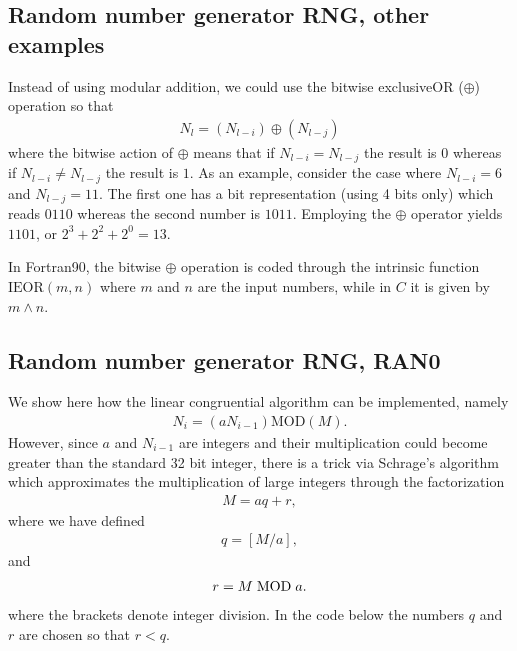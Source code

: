 \documentclass[letterpaper,10pt,english]{sphinxmanual}
\begin{document}
\subsection{Random number generator RNG, other examples}
\label{\detokenize{chapter2:id9}}
Instead of  using modular addition, we could use the bitwise
exclusive\sphinxhyphen{}OR (\(\oplus\)) operation so that
\begin{equation*}
\begin{split}
N_l=(N_{l-i})\oplus (N_{l-j})
\end{split}
\end{equation*}
where the bitwise action of \(\oplus\) means that if \(N_{l-i}=N_{l-j}\) the result is
\(0\) whereas if \(N_{l-i}\ne N_{l-j}\) the result is
\(1\). As an example, consider the case where  \(N_{l-i}=6\) and \(N_{l-j}=11\). The first
one has a bit representation (using 4 bits only) which reads \(0110\) whereas the
second number is \(1011\). Employing the \(\oplus\) operator yields
\(1101\), or \(2^3+2^2+2^0=13\).

In Fortran90, the bitwise \(\oplus\) operation is coded through the intrinsic
function \(\mathrm{IEOR}(m,n)\) where \(m\) and \(n\) are the input numbers, while in \(C\)
it is given by \(m\wedge n\).


\subsection{Random number generator RNG, RAN0}
\label{\detokenize{chapter2:random-number-generator-rng-ran0}}
We show here how the linear congruential algorithm can be implemented, namely
\begin{equation*}
\begin{split}
N_i=(aN_{i-1}) \mathrm{MOD} (M).
\end{split}
\end{equation*}
However, since \(a\) and \(N_{i-1}\) are integers and their multiplication
could become greater than the standard 32 bit integer, there is a trick via
Schrage’s algorithm which approximates the multiplication
of large integers through the factorization
\begin{equation*}
\begin{split}
M=aq+r,
\end{split}
\end{equation*}
where we have defined
\begin{equation*}
\begin{split}
q=[M/a],
\end{split}
\end{equation*}
and
\begin{equation*}
\begin{split}
r = M\hspace{0.1cm}\mathrm{MOD} \hspace{0.1cm}a.
\end{split}
\end{equation*}
where the brackets denote integer division. In the code below the numbers
\(q\) and \(r\) are chosen so that \(r < q\).
\end{document}
